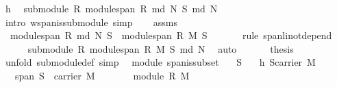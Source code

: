 \begin{isabellebody}
\ h{}\ \isamarkupfalse%
\ {}{\isacharcolon}{\isachardoublequoteopen}submodule\ R\ {\isacharparenleft}module{\isachardot}span\ R\ {\isacharparenleft}md\ N{\isacharparenright}\ S{\isacharparenright}\ {\isacharparenleft}md\ N{\isacharparenright}{\isachardoublequoteclose}\ \isanewline
\ \ \ \ \isamarkupfalse%
\ {\isacharparenleft}intro\ w{\isachardot}span{\isacharunderscore}is{\isacharunderscore}submodule{\isacharcomma}\ simp{\isacharparenright}\isanewline
\ \ \isamarkupfalse%
\ assms\ \isamarkupfalse%
\ {}{\isacharcolon}\ {\isachardoublequoteopen}module{\isachardot}span\ R\ {\isacharparenleft}md\ N{\isacharparenright}\ S\ {\isacharequal}\ module{\isachardot}span\ R\ M\ S{\isachardoublequoteclose}\isanewline
\ \ \ \ \ \isamarkupfalse%
\ {\isacharparenleft}rule\ span{\isacharunderscore}li{\isacharunderscore}not{\isacharunderscore}depend{\isacharparenright}\isanewline
\ \ \isamarkupfalse%
\ {}\ {}\ \isamarkupfalse%
\ {}{\isacharcolon}\ {\isachardoublequoteopen}submodule\ R\ {\isacharparenleft}module{\isachardot}span\ R\ M\ S{\isacharparenright}\ {\isacharparenleft}md\ N{\isacharparenright}{\isachardoublequoteclose}\ \isamarkupfalse%
\ auto\isanewline
\ \ \isamarkupfalse%
\ {}\ \isamarkupfalse%
\ {\isacharquery}thesis\ \isamarkupfalse%
\ {\isacharparenleft}unfold\ submodule{\isacharunderscore}def{\isacharcomma}\ simp{\isacharparenright}\isanewline
{}\isamarkupfalse%
%
\endisatagproof
{\isafoldproof}%
%
\isadelimproof
\isanewline
%
\endisadelimproof
\isanewline
\isanewline
{}\isamarkupfalse%
\ {\isacharparenleft}\ module{\isacharparenright}\ span{\isacharunderscore}is{\isacharunderscore}subset{}{\isacharcolon}\isanewline
\ \ \ S\isanewline
\ \ \ h{}{\isacharcolon}\ {\isachardoublequoteopen}S{\isasymsubseteq}carrier\ M{\isachardoublequoteclose}\isanewline
\ \ \ {\isachardoublequoteopen}span\ S\ {\isasymsubseteq}\ carrier\ M{\isachardoublequoteclose}\isanewline
%
\isadelimproof
%
\endisadelimproof
%
\isatagproof
{}\isamarkupfalse%
\ {\isacharminus}\ \isanewline
\ \ \isamarkupfalse%
\ {}{\isacharcolon}\ {\isachardoublequoteopen}module\ R\ M{\isachardoublequoteclose}\isacommand{{\isachardot}{\isachardot}}\isamarkupfalse%
\isanewline
\ \ \isamarkupfalse%

\end{isabellebody}
